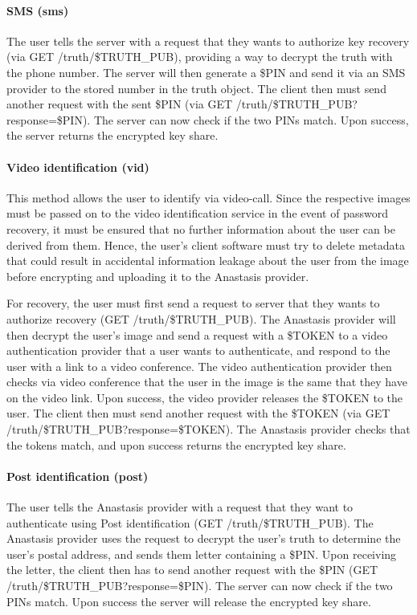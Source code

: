 \paragraph{SMS (sms)}

The user tells the server with a request that they wants to authorize
key recovery (via GET /truth/\$TRUTH\_PUB), providing a way to decrypt the
truth with the phone number. The server will then generate a \$PIN and
send it via an SMS provider to the stored number in the truth
object. The client then must send another request with the sent \$PIN
(via GET /truth/\$TRUTH\_PUB?response=\$PIN). The server can now check
if the two PINs match. Upon success, the server returns the encrypted
key share.

\paragraph{Video identification (vid)}

This method allows the user to identify via video-call.  Since the
respective images must be passed on to the video identification
service in the event of password recovery, it must be ensured that no
further information about the user can be derived from them.  Hence,
the user's client software must try to delete metadata that could
result in accidental information leakage about the user from the image
before encrypting and uploading it to the Anastasis provider.

For recovery, the user must first send a request to server that they
wants to authorize recovery (GET /truth/\$TRUTH\_PUB).  The Anastasis
provider will then decrypt the user's image and send a request with a
\$TOKEN to a video authentication provider that a user wants to
authenticate, and respond to the user with a link to a video
conference.  The video authentication provider then checks via video
conference that the user in the image is the same that they have on
the video link. Upon success, the video provider releases the \$TOKEN
to the user.  The client then must send another request with the
\$TOKEN (via GET /truth/\$TRUTH\_PUB?response=\$TOKEN). The Anastasis
provider checks that the tokens match, and upon success returns the
encrypted key share.

\paragraph{Post identification (post)}

The user tells the Anastasis provider with a request that they want
to authenticate using Post identification (GET /truth/\$TRUTH\_PUB).  The
Anastasis provider uses the request to decrypt the user's truth to
determine the user's postal address, and sends them letter containing
a \$PIN.  Upon receiving the letter, the client then has to send
another request with the \$PIN (GET /truth/\$TRUTH\_PUB?response=\$PIN). The
server can now check if the two PINs match. Upon success the server
will release the encrypted key share.

